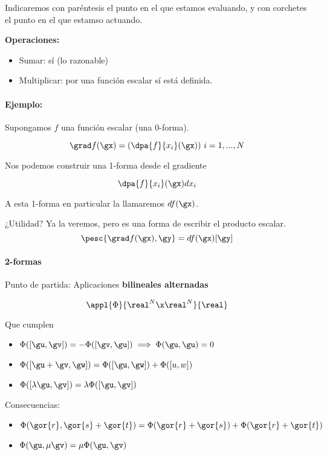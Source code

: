 Indicaremos con paréntesis el punto en el que estamos evaluando, y con corchetes el punto en el que estamso actuando.

\textbf{Operaciones:}
\begin{itemize}
\item Sumar: sí (lo razonable)
\item Multiplicar: por una función escalar sí está definida.
\end{itemize}


\paragraph{Ejemplo:}

Supongamos $f$ una función escalar (una 0-forma).

\[\grad f(\gx) = \left( \dpa{f}{x_i}(\gx)\right)\, i=1,...,N\]

Nos podemos construir una 1-forma desde el gradiente

\[\dpa{f}{x_i}(\gx)dx_i \]

A esta 1-forma en particular la llamaremos $df(\gx)$.

¿Utilidad? Ya la veremos, pero es una forma de escribir el producto escalar.
\[\pesc{\grad f(\gx),\gy} = df(\gx)[\gy]\]


\paragraph{2-formas}

Punto de partida: Aplicaciones \textbf{bilineales alternadas}

\[\appl{\Phi}{\real^N\x\real^N}{\real}\]

Que cumplen \begin{itemize}
\item $\Phi([\gu,\gv]) = - \Phi([\gv,\gu]) \implies \Phi(\gu,\gu)=0$
\item $ \Phi([\gu+\gv,\gw]) = \Phi ([\gu,\gw]) + \Phi([u,w])$
\item$\Phi([\lambda \gu,\gv]) = \lambda \Phi([\gu,\gv])$
\end{itemize}

Consecuencias:

\begin{itemize}
\item $\Phi(\gor{r}, \gor{s}+\gor{t}) = \Phi(\gor{r}+\gor{s}) + \Phi(\gor{r}+\gor{t})$
\item $\Phi(\gu,\mu\gv) = \mu\Phi(\gu,\gv)$
\end{itemize}


